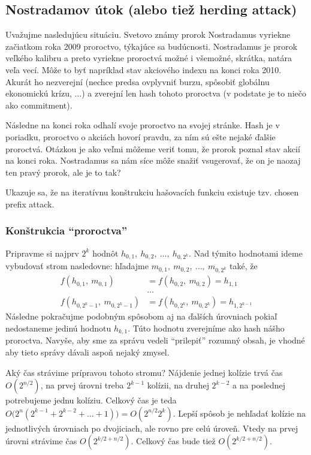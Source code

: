 \subsection{Nostradamov útok (alebo tiež herding attack)}

Uvažujme nasledujúcu situáciu. Svetovo známy prorok Nostradamus
vyriekne začiatkom roka 2009 proroctvo, týkajúce sa budúcnosti.
Nostradamus je prorok veľkého kalibru a preto vyriekne proroctvá
možné i všemožné, skrátka, natára veľa vecí.
Môže to byť napríklad stav akciového indexu na konci roka 2010.
Akurát ho nezverejní (nechce predsa ovplyvniť burzu, spôsobiť globálnu
ekonomickú krízu, ...) a zverejní len hash tohoto proroctva 
(v podstate je to niečo ako commitment).

Následne na konci roka odhalí svoje proroctvo na svojej stránke.
Hash je v poriadku, proroctvo
o akciách hovorí pravdu, za ním sú ešte nejaké ďalšie proroctvá.
Otázkou je ako veľmi môžeme veriť tomu, že prorok poznal stav
akcií na konci roka. Nostradamus sa nám síce môže snažiť vsugerovať,
že on je naozaj ten pravý prorok, ale je to tak?

Ukazuje sa, že na iteratívnu konštrukciu
hašovacích funkciu existuje tzv. chosen prefix attack.

\subsubsection{Konštrukcia ``proroctva''}

Pripravme si najprv $2^k$ hodnôt $h_{0,1},\ h_{0,2},\ \dots,\ h_{0,2^k}$.
Nad týmito hodnotami ideme vybudovať strom nasledovne:
hľadajme $m_{0,1},\ m_{0,2},\ \dots,\ m_{0,2^k}$ také, že
\begin{align*}
    f(h_{0,1},\ m_{0,1}) &= f(h_{0,2},\ m_{0,2}) = h_{1,1} \\
  &  \dots \\
    f(h_{0,2^k-1},\ m_{0,2^k-1}) &= f(h_{0,2^k},\ m_{0,2^k}) = h_{1,
        2^{k-1}} 
\end{align*}
Následne pokračujme podobným spôsobom aj na ďalších úrovniach
pokiaľ nedostaneme jedinú hodnotu $h_{k,1}$.
Túto hodnotu zverejníme ako hash nášho proroctva.
Navyše, aby sme za správu vedeli ``prilepiť'' rozumný obsah,
je vhodné aby tieto správy dávali aspoň nejaký zmysel.

Aký čas strávime prípravou tohoto stromu?
Nájdenie jednej kolízie trvá čas $O(2^{n/2})$, na prvej úrovni treba 
$2^{k-1}$ kolízii, na druhej $2^{k-2}$ a na poslednej
potrebujeme jednu kolíziu. Celkový čas je teda
$O\big(2^n (2^{k-1} + 2^{k-2} + \dots + 1)\big) = O(2^{n/2} 2^k)$.
Lepší spôsob je nehľadať kolízie na jednotlivých úrovniach po dvojiciach,
ale rovno pre celú úroveň.
Vtedy na prvej úrovni strávime čas $O(2^{k/2 + n/2})$. 
Celkový čas bude tiež $O(2^{k/2 + n/2})$.

